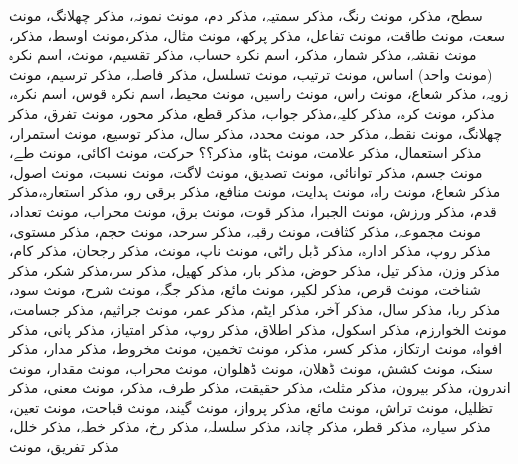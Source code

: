 سطح، مذکر، مونث
رنگ، مذکر
سمتیہ، مذکر
دم، مونث
نمونہ، مذکر
چھلانگ، مونث
سعت، مونث
طاقت، مونث
تفاعل، مذکر
پرکھ، مونث
مثال، مذکر،مونث
اوسط، مذکر، مونث
نقشہ، مذکر
شمار، مذکر، اسم نکرہ
حساب، مذکر
تقسیم، مونث، اسم نکرہ (مونث واحد)
اساس، مونث
ترتیب، مونث
تسلسل، مذکر
فاصلہ، مذکر
ترسیم، مونث
زویہ، مذکر
شعاع، مونث
راس، مونث
راسیں، مونث
محیط، اسم نکرہ
قوس، اسم نکرہ، مذکر، مونث
کرہ، مذکر
کلیہ،مذکر
جواب، مذکر
قطع، مذکر
محور، مونث
تفرق، مذکر
چھلانگ، مونث
نقطہ، مذکر
حد، مونث
محدد، مذکر
سال، مذکر
توسیع، مونث
استمرار، مذکر
استعمال، مذکر
علامت، مونث
ہٹاو، مذکر؟؟
حرکت، مونث
اکائی، مونث
طے، مونث
جسم، مذکر
توانائی، مونث
تصدیق، مونث
لاگت، مونث
نسبت، مونث
اصول، مذکر
شعاع، مونث
راہ، مونث
ہدایت، مونث
منافع، مذکر
برقی رو، مذکر
استعارہ،مذکر
قدم، مذکر
ورزش، مونث
الجبرا، مذکر
قوت، مونث
برق، مونث
محراب، مونث
تعداد، مونث
مجموعہ، مذکر
کثافت، مونث
رقبہ، مذکر
سرحد، مونث
حجم، مذکر
مستوی، مذکر
روپ، مذکر
ادارہ، مذکر
ڈبل راٹی، مونث
ناپ، مونث، مذکر
رجحان، مذکر
کام، مذکر
وزن، مذکر
تیل، مذکر
حوض، مذکر
بار، مذکر
کھیل، مذکر
سر،مذکر
شکر، مذکر
شناخت، مونث
 قرص، مذکر
لکیر، مونث
مائع، مذکر
جگہ، مونث
شرح، مونث
سود، مذکر
ربا، مذکر
سال، مذکر
آخر، مذکر
ایٹم، مذکر
عمر، مونث
جراثیم، مذکر
جسامت، مونث
الخوارزم، مذکر
اسکول، مذکر
اطلاق، مذکر
روپ، مذکر
امتیاز، مذکر
پانی، مذکر
افواہ، مونث
ارتکاز، مذکر
کسر، مذکر، مونث
تخمین، مونث
مخروط، مذکر
مدار، مذکر
سنک، مونث
کشش، مونث
ڈھلان، مونث
ڈھلوان، مونث
محراب، مونث
مقدار، مونث
اندرون، مذکر
بیرون، مذکر
مثلث، مذکر
حقیقت، مذکر
طرف، مذکر، مونث
معنی، مذکر
تظلیل، مونث
تراش، مونث
مائع، مذکر
پرواز، مونث
گیند، مونث
قباحت، مونث
تعین، مذکر
سیارہ، مذکر
قطر، مذکر
چاند، مذکر
سلسلہ، مذکر
رخ، مذکر
خطہ، مذکر
خلل، مذکر
تفریق، مونث

